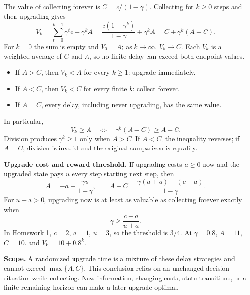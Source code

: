 \documentclass[11pt]{article}
\theoremstyle{remark}\newtheorem{remark}[definition]{Remark}
\begin{document}
The value of collecting forever is $C=c/(1-\gamma)$. Collecting for $k\ge0$ steps and then upgrading gives
\[
V_k=\sum_{t=0}^{k-1}\gamma^t c+\gamma^k A
=\frac{c(1-\gamma^k)}{1-\gamma}+\gamma^k A
=\boxed{C+\gamma^k(A-C).}
\]
For $k=0$ the sum is empty and $V_0=A$; as $k\to\infty$, $V_k\to C$. Each $V_k$ is a weighted average of $C$ and $A$, so no finite delay can exceed both endpoint values.
\begin{itemize}
\item If $A>C$, then $V_k<A$ for every $k\ge1$: upgrade immediately.
\item If $A<C$, then $V_k<C$ for every finite $k$: collect forever.
\item If $A=C$, every delay, including never upgrading, has the same value.
\end{itemize}
In particular,
\[
V_k\ge A\quad\Longleftrightarrow\quad
\gamma^k(A-C)\ge A-C.
\]
Division produces $\gamma^k\ge1$ only when $A>C$. If $A<C$, the inequality reverses; if $A=C$, division is invalid and the original comparison is equality.

\textbf{Upgrade cost and reward threshold.} If upgrading costs $a\ge0$ now and the upgraded state pays $u$ every step starting next step, then
\[
A=-a+\frac{\gamma u}{1-\gamma},\qquad
A-C=\frac{\gamma(u+a)-(c+a)}{1-\gamma}.
\]
For $u+a>0$, upgrading now is at least as valuable as collecting forever exactly when
\[
\boxed{\gamma\ge\frac{c+a}{u+a}.}
\]
In Homework 1, $c=2$, $a=1$, $u=3$, so the threshold is $3/4$. At $\gamma=0.8$, $A=11$, $C=10$, and $V_k=10+0.8^k$.

\textbf{Scope.} A randomized upgrade time is a mixture of these delay strategies and cannot exceed $\max\{A,C\}$. This conclusion relies on an unchanged decision situation while collecting. New information, changing costs, state transitions, or a finite remaining horizon can make a later upgrade optimal.
\end{document}
